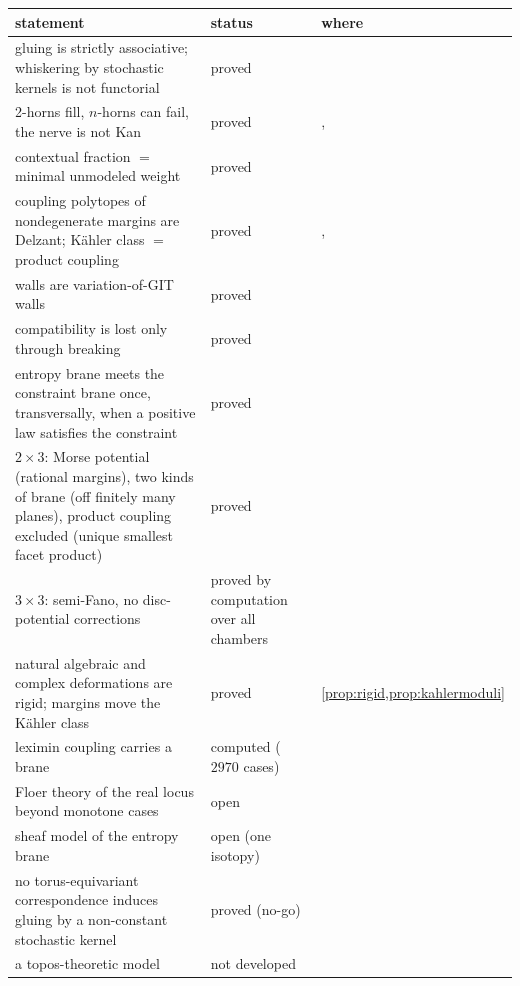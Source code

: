 \documentclass[11pt]{article}
\theoremstyle{definition}
\theoremstyle{remark}
\begin{document}
\begin{center}
\small
\begin{tabular}{p{7.2cm}p{2.2cm}p{5.4cm}}
\toprule
statement & status & where\\
\midrule
gluing is strictly associative; whiskering by stochastic kernels is not functorial & proved & \cite{Conditionals}\\
2-horns fill, $n$-horns can fail, the nerve is not Kan & proved & \cite[\S4]{Conditionals}, \cite[Prop.~6.2]{Bands}\\
contextual fraction $=$ minimal unmodeled weight & proved & \cite{Attribution}\\
coupling polytopes of nondegenerate margins are Delzant; Kähler class $=$ product coupling & proved & \cite[Thm.~6.4]{Conditionals}, \cite[Prop.~2.2]{Family}\\
walls are variation-of-GIT walls & proved & \cite[Prop.~10.5]{Conditionals}\\
compatibility is lost only through breaking & proved & \cite[Thm.~8.1]{Bands}\\
entropy brane meets the constraint brane once, transversally, when a positive law satisfies the constraint & proved & \cite[Thm.~3.1]{Bridges}\\
$2\times3$: Morse potential (rational margins), two kinds of brane (off finitely many planes), product coupling excluded (unique smallest
facet product) & proved & \cite[Thm.~8.2]{Bridges}\\
$3\times3$: semi-Fano, no disc-potential corrections & proved by computation over all chambers & \cite[Thm.~8.4]{Bridges}\\
natural algebraic and complex deformations are rigid; margins move the Kähler class & proved & \cref{prop:rigid,prop:kahlermoduli}\\
leximin coupling carries a brane & computed ($2970$ cases) & \cite[Thm.~8.2(iv)]{Bridges}\\
Floer theory of the real locus beyond monotone cases & open & \cite[\S8.4]{Bridges}\\
sheaf model of the entropy brane & open (one isotopy) & \cite[Prop.~8.7]{Bridges}\\
no torus-equivariant correspondence induces gluing by a non-constant stochastic kernel & proved (no-go) & \cite[Thm.~6.1]{Bridges}\\
a topos-theoretic model & not developed & \cite{IshamButterfield1998}\\
\bottomrule
\end{tabular}
\end{center}
\end{document}
